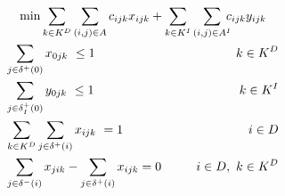 \documentclass{article}
\begin{document}
{%
\iffalse
\begin{align}
\label{model:obj} \min  &  \sum_{k \in K^{D}}\sum_{(i,j) \in A} c_{ijk}x_{ijk} + \sum_{k \in K^{I}}\sum_{(i,j) \in A^I} \hspace{-2mm}c_{ijk}y_{ijk}  &\\
\label{c1} &\hspace{-10mm} \sum_{j \in \delta^{+}(0)}x_{0jk}\ \leq 1 & \hspace{-40mm}  k \in K^{D} \hspace{0mm}\\
\label{c2} &\hspace{-10mm} \sum_{j \in \delta^{+}_I(0)}y_{0jk}\ \leq 1 & \hspace{-40mm}  k \in K^{I} \hspace{0mm}  \\
\label{c3} & \hspace{-10mm}  \sum_{k \in K^{D}}\sum_{j \in \delta^{+}(i)}x_{ijk}\ = 1 & \hspace{-40mm}i \in D \hspace{0mm}  \\
\label{c4} & \hspace{-10mm}  \sum_{j \in \delta^{-}(i)}x_{jik} - \sum_{j \in \delta^{+}(i)}x_{ijk} = 0 &\hspace{-40mm}i \in D ,\ k \in K^{D} \hspace{0mm} \\

\end{align}}
\end{document}
